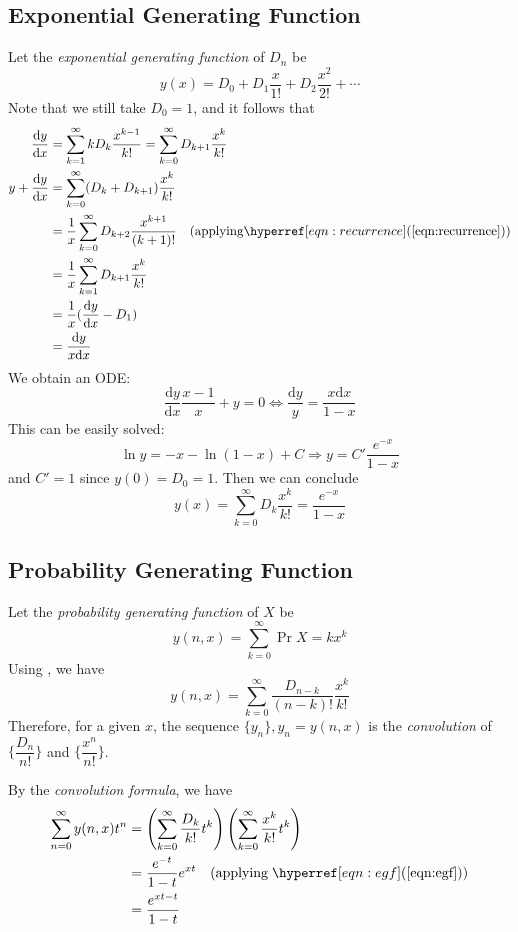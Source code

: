 \subsection{Exponential Generating Function}
Let the \emph{exponential generating function} of $ D_n$ be
\[ y(x) = D_0 +D_1\dfrac{x}{1!}+D_2\dfrac{x^2}{2!}+\cdots \]
Note that we still take $ D_0=1$, and it follows that
\begin{align*}
  \dfrac{\mathrm{d}y}{\mathrm{d}x} &= \sum_{k=1}^{\infty}kD_k\dfrac{x^{k-1}}{k!} = \sum_{k=0}^{\infty}D_{k+1}\dfrac{x^k}{k!} \\
y+\dfrac{\mathrm{d}y}{\mathrm{d}x} &= \sum_{k=0}^{\infty}(D_k+D_{k+1})\dfrac{x^k}{k!} \\
&=\dfrac{1}{x}\sum_{k=0}^{\infty}D_{k+2}\dfrac{x^{k+1}}{(k+1)!} \quad(\text{applying} \eqnref{recurrence}) \\
&= \dfrac{1}{x}\sum_{k=1}^{\infty}D_{k+1}\dfrac{x^{k}}{k!} \\
&= \dfrac{1}{x}(\dfrac{\mathrm{d}y}{\mathrm{d}x}-D_1)\\
&= \dfrac{\mathrm{d}y}{x\mathrm{d}x}
\end{align*}
We obtain an ODE:
\[ \dfrac{\mathrm{d}y}{\mathrm{d}x}\dfrac{x-1}{x}+y = 0\Leftrightarrow \dfrac{\mathrm{d}y}{y}=\dfrac{x\mathrm{d}x}{1-x}\]
  This can be easily solved:
  \[ \ln y = -x-\ln(1-x) +C\Rightarrow y = C'\dfrac{e^{-x}}{1-x} \]
and $ C'=1$ since $ y(0) = D_0=1$. Then we can conclude
  \begin{equation}
  y(x) = \sum_{k=0}^{\infty}D_k\dfrac{x^k}{k!} = \dfrac{e^{-x}}{1-x}
  \label{eqn:egf}
  \end{equation}

\subsection{Probability Generating Function}
\label{sec:gf}
Let the \emph{probability generating function} of $ X$ be
\[ y(n,x) = \sum_{k=0}^{\infty}\Pr{X=k}x^k\]
Using , we have
\[ y(n,x) = \sum_{k=0}^{\infty}\dfrac{D_{n-k}}{(n-k)!}\dfrac{x^k}{k!}\]
Therefore, for a given $x$, the sequence $ \{ y_n\}, y_n = y(n,x)$ is the \emph{convolution} of
$ \{ \dfrac{D_n}{n!}\}$ and $ \{ \dfrac{x^n}{n!} \}$.

By the \emph{convolution formula}, we have
\begin{align*}
  \sum_{n=0}^{\infty} y(n,x)t^n &= \left( \sum_{k=0}^{\infty}\dfrac{D_k}{k!}t^k\right)\left( \sum_{k=0}^{\infty}\dfrac{x^k}{k!}t^k\right) \\
  &=\dfrac{e^{-t}}{1-t}e^{xt} \quad (\text{applying} \; \eqnref{egf})\\
  &= \dfrac{e^{xt-t}}{1-t}
\end{align*}

